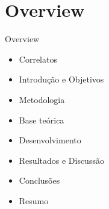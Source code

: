 \section{Overview}

\begin{frame}	
	\begin{block}{Overview}
		 \begin{itemize}
			  \item Correlatos			  
			  \item Introdução e Objetivos
			  \item Metodologia
			  \item Base teórica
			  \item Desenvolvimento
			  \item Resultados e Discussão
			  \item Conclusões
		      \item Resumo
		  \end{itemize}
	\end{block}
\end{frame}
